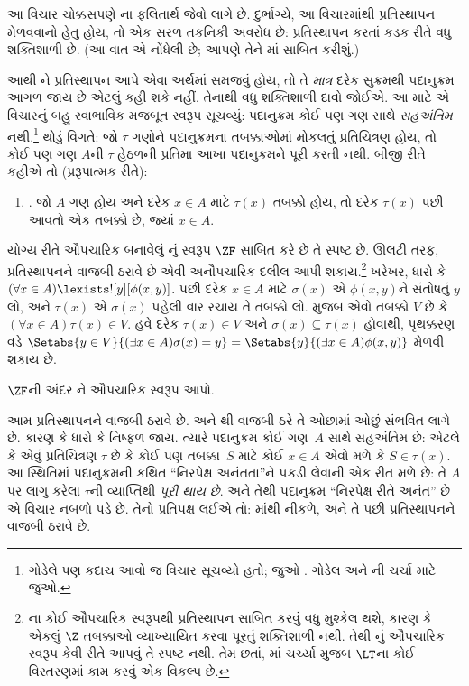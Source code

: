આ વિચાર ચોક્કસપણે \stagesinex{}ના ફલિતાર્થ જેવો લાગે
છે. દુર્ભાગ્યે, આ વિચારમાંથી પ્રતિસ્થાપન મેળવવાનો હેતુ
હોય, તો એક સરળ તકનિકી અવરોધ છે: પ્રતિસ્થાપન
કરતાં કડક રીતે વધુ શક્તિશાળી છે. (આ વાત
\citet[\S13.2]{Potter2004}એ નોંધેલી છે; આપણે તેને
માં
સાબિત કરીશું.)

આથી \stagesinex{}ને પ્રતિસ્થાપન આપે એવા અર્થમાં
સમજવું હોય, તો તે \emph{માત્ર} દરેક સુક્રમથી
પદાનુક્રમ આગળ જાય છે એટલું કહી શકે નહીં. તેનાથી
વધુ શક્તિશાળી દાવો જોઈએ. આ માટે \cite{Shoenfield:AST}એ
વિચારનું બહુ સ્વાભાવિક મજબૂત સ્વરૂપ સૂચવ્યું: પદાનુક્રમ
કોઈ પણ ગણ સાથે \emph{સહઅંતિમ} નથી.\footnote{ગોડેલે
પણ કદાચ આવો જ વિચાર સૂચવ્યો હતો; જુઓ
\citet[p.~223]{Potter2004}. ગોડેલ અને
\citeauthor{Shoenfield:AST}ની ચર્ચા માટે
\citet[90--5]{Incurvati2020} જુઓ.} થોડું વિગતે:
જો $\tau$ ગણોને પદાનુક્રમના તબક્કાઓમાં મોકલતું
પ્રતિચિત્રણ હોય, તો કોઈ પણ ગણ $A$ની $\tau$ હેઠળની
પ્રતિમા આખા પદાનુક્રમને પૂરી કરતી નથી. બીજી રીતે
કહીએ તો (પ્રરૂપાત્મક રીતે):
\begin{enumerate}
	\item[] \stagescofin. જો $A$ ગણ હોય અને દરેક
	$x \in A$ માટે $\tau(x)$ તબક્કો હોય, તો દરેક
	$\tau(x)$ પછી આવતો એક તબક્કો છે, જ્યાં $x \in A$.
\end{enumerate}
યોગ્ય રીતે ઔપચારિક બનાવેલું \stagescofin{}નું સ્વરૂપ
$\ZF$ સાબિત કરે છે તે સ્પષ્ટ છે. ઊલટી તરફ,
\stagescofin{} પ્રતિસ્થાપનને વાજબી ઠરાવે છે એવી
અનૌપચારિક દલીલ આપી શકાય.\footnote{\stagescofin{}ના
કોઈ ઔપચારિક સ્વરૂપથી પ્રતિસ્થાપન સાબિત કરવું વધુ મુશ્કેલ
થશે, કારણ કે એકલું $\Z$ તબક્કાઓ વ્યાખ્યાયિત કરવા
પૂરતું શક્તિશાળી નથી. તેથી \stagescofin{}નું
ઔપચારિક સ્વરૂપ કેવી રીતે આપવું તે સ્પષ્ટ નથી. તેમ છતાં,
માં ચર્ચ્યા મુજબ
$\LT$ના કોઈ વિસ્તરણમાં કામ કરવું એક વિકલ્પ છે.}
ખરેખર, ધારો કે $(\forall x \in A)\lexists![y][\phi(x,y)]$.
પછી દરેક $x \in A$ માટે $\sigma(x)$ એ
$\phi(x,y)$ને સંતોષતું $y$ લો, અને $\tau(x)$ એ
$\sigma(x)$ પહેલી વાર રચાય તે તબક્કો લો.
\stagescofin{} મુજબ એવો તબક્કો $V$ છે કે
$(\forall x \in A)\tau(x)\in V$. હવે દરેક
$\tau(x) \in V$ અને $\sigma(x) \subseteq \tau(x)$
હોવાથી, પૃથક્કરણ વડે
$\Setabs{y
\in V}{(\exists x \in A)\sigma(x) = y} = \Setabs{y}{(\exists x \in
A)\phi(x,y)}$ મેળવી શકાય છે.

\begin{prob}
	$\ZF$ની અંદર \stagescofin{}ને ઔપચારિક સ્વરૂપ આપો.
\end{prob}

આમ \stagescofin{} પ્રતિસ્થાપનને વાજબી ઠરાવે છે.
અને \stagesinex{}થી \stagescofin{} વાજબી ઠરે તે
ઓછામાં ઓછું સંભવિત લાગે છે. કારણ કે ધારો કે
\stagescofin{} નિષ્ફળ જાય. ત્યારે પદાનુક્રમ કોઈ ગણ~$A$
સાથે સહઅંતિમ છે: એટલે કે એવું પ્રતિચિત્રણ $\tau$ છે
કે કોઈ પણ તબક્કા~$S$ માટે કોઈ $x \in A$ એવો મળે
કે $S \in \tau(x)$. આ સ્થિતિમાં પદાનુક્રમની કથિત
``નિરપેક્ષ અનંતતા''ને પકડી લેવાની એક રીત મળે છે:
તે $A$ પર લાગુ કરેલા $\tau$ની વ્યાપ્તિથી
\emph{પૂરી થાય છે}. અને તેથી પદાનુક્રમ ``નિરપેક્ષ
રીતે અનંત'' છે એ વિચાર નબળો પડે છે. તેનો પ્રતિપક્ષ
લઈએ તો: \stagesinex{}માંથી \stagescofin{} નીકળે,
અને તે પછી પ્રતિસ્થાપનને વાજબી ઠરાવે છે.

